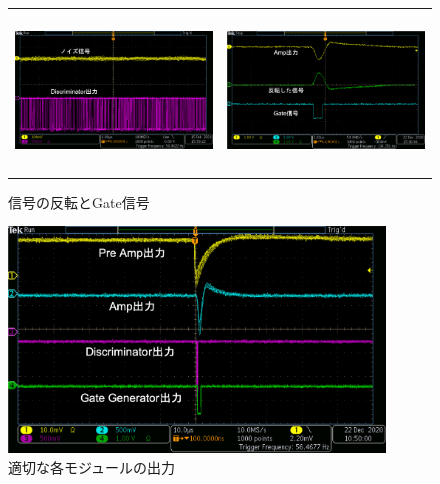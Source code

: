 \documentclass[a4paper,11pt,dvipdfmx]{jsarticle}
\begin{document}
 \begin{figure}[H]
    \begin{tabular}{cc}
      \begin{minipage}[t]{0.50\hsize}
        \centering
        \includegraphics[width=65mm,height=42mm]{picture/daq/noise.png}
        \caption{ノイズ信号にディスクリミネーターが反応している様子}
        \label{noise}
      \end{minipage} &
      \begin{minipage}[t]{0.50\hsize}
        \centering
        \includegraphics[width=65mm,height=42mm]{picture/daq/Gate.png}
        \caption{信号の反転とGate信号}
        \label{Gate}
      \end{minipage}
    \end{tabular}
  \end{figure}

\vspace*{3mm}

\begin{figure}[H]
\centering
\includegraphics[width=100mm,height=60mm]{picture/daq/signal.png}
\caption{適切な各モジュールの出力}
\label{signal}
\end{figure}
\end{document}
